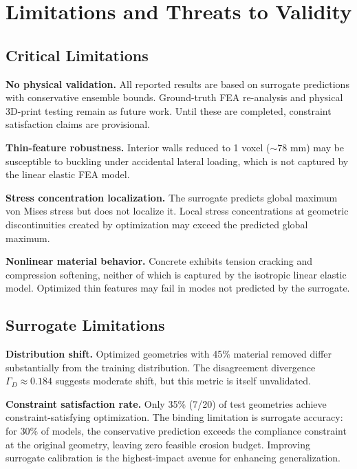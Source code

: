 \documentclass[11pt]{article}
\theoremstyle{plain}
\theoremstyle{definition}
\theoremstyle{remark}
\begin{document}
\section{Limitations and Threats to Validity}
\label{sec:limitations}

\subsection{Critical Limitations}

\textbf{No physical validation.} All reported results are based on surrogate predictions with conservative ensemble bounds. Ground-truth FEA re-analysis and physical 3D-print testing remain as future work. Until these are completed, constraint satisfaction claims are provisional.

\textbf{Thin-feature robustness.} Interior walls reduced to 1 voxel ($\sim$78 mm) may be susceptible to buckling under accidental lateral loading, which is not captured by the linear elastic FEA model.

\textbf{Stress concentration localization.} The surrogate predicts global maximum von Mises stress but does not localize it. Local stress concentrations at geometric discontinuities created by optimization may exceed the predicted global maximum.

\textbf{Nonlinear material behavior.} Concrete exhibits tension cracking and compression softening, neither of which is captured by the isotropic linear elastic model. Optimized thin features may fail in modes not predicted by the surrogate.

\subsection{Surrogate Limitations}

\textbf{Distribution shift.} Optimized geometries with 45\% material removed differ substantially from the training distribution. The disagreement divergence $\Gamma_D \approx 0.184$ suggests moderate shift, but this metric is itself unvalidated.

\textbf{Constraint satisfaction rate.} Only 35\% (7/20) of test geometries achieve constraint-satisfying optimization. The binding limitation is surrogate accuracy: for 30\% of models, the conservative prediction exceeds the compliance constraint at the original geometry, leaving zero feasible erosion budget. Improving surrogate calibration is the highest-impact avenue for enhancing generalization.
\end{document}

